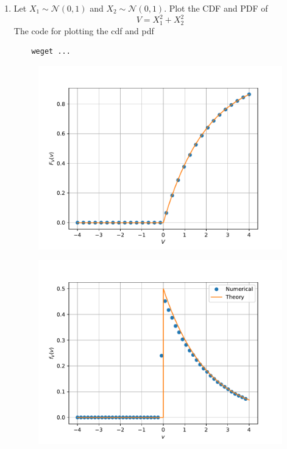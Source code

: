 \documentclass[journal,12pt,twocolumn]{IEEEtran}
\renewcommand\thesection{\arabic{section}}
\providecommand{\gauss}[2]{\mathcal{N}\ensuremath{\left(#1,#2\right)}}
\begin{document}
\begin{enumerate}[label=\thesection.\arabic*
    ,ref=\thesection.\theenumi]
\item
Let $X_1 \sim  \gauss{0}{1}$ and $X_2 \sim  \gauss{0}{1}$. Plot the CDF and PDF of
%
\begin{equation}
V = X_1^2 + X_2^2
\end{equation}
\solution
The code for plotting the cdf and pdf
\begin{lstlisting}
    weget ...
\end{lstlisting}
\begin{figure}
    \centering
    \includegraphics[width=\columnwidth]{./figs/squgau_cdf.pdf}
    \label{fig:vcdf}
\end{figure}
\begin{figure}
    \centering
    \includegraphics[width=\columnwidth]{./figs/squgau_pdf.pdf}

\end{figure}
\end{enumerate}
\end{document}
